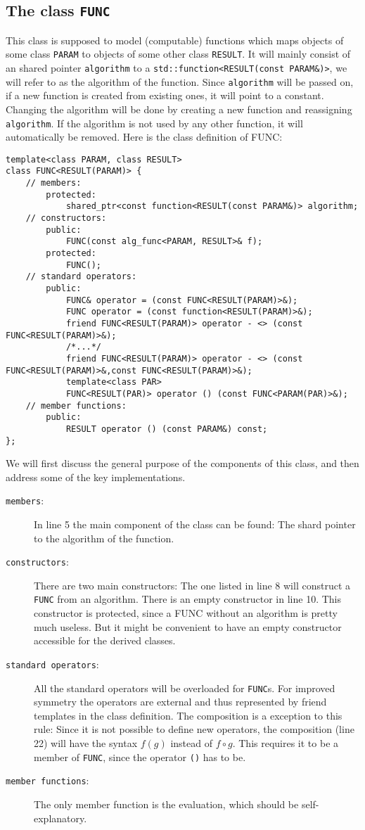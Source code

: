 \documentclass{article}
\newcommand{\code}[1]{\texttt{#1}}
\newcommand{\func}[1]{\texttt{#1}}
\begin{document}
\subsection{The class \func{FUNC}}

This class is supposed to model (computable) functions which maps objects of some class \code{PARAM} to objects of some other class \code{RESULT}. It will mainly consist of an shared pointer \code{algorithm} to a \code{std::function<RESULT(const PARAM\&)>}, we will refer to as the algorithm of the function. Since \code{algorithm} will be passed on, if a new function is created from existing ones, it will point to a constant. Changing the algorithm will be done by creating a new function and reassigning \code{algorithm}. If the algorithm is not used by any other function, it will automatically be removed. Here is the class definition of FUNC:
\begin{lstlisting}
template<class PARAM, class RESULT>
class FUNC<RESULT(PARAM)> {
	// members:
		protected:
			shared_ptr<const function<RESULT(const PARAM&)> algorithm;
	// constructors:
		public:
			FUNC(const alg_func<PARAM, RESULT>& f);
		protected:
			FUNC();
	// standard operators:
		public:
			FUNC& operator = (const FUNC<RESULT(PARAM)>&);
			FUNC operator = (const function<RESULT(PARAM)>&);
			friend FUNC<RESULT(PARAM)> operator - <> (const FUNC<RESULT(PARAM)>&);
			/*...*/
			friend FUNC<RESULT(PARAM)> operator - <> (const FUNC<RESULT(PARAM)>&,const FUNC<RESULT(PARAM)>&);
			template<class PAR>
			FUNC<RESULT(PAR)> operator () (const FUNC<PARAM(PAR)>&);
	// member functions:
		public:
			RESULT operator () (const PARAM&) const;
};
\end{lstlisting}
We will first discuss the general purpose of the components of this class, and then address some of the key implementations.
\begin{description}
\item[\code{members}:] In line 5 the main component of the class can be found: The shard pointer to the algorithm of the function.
\item[\code{constructors}:] There are two main constructors: The one listed in line 8 will construct a \func{FUNC} from an algorithm. There is an empty constructor in line 10. This constructor is protected, since a FUNC without an algorithm is pretty much useless. But it might be convenient to have an empty constructor accessible for the derived classes.
\item[\code{standard operators}:] All the standard operators will be overloaded for \func{FUNC}s. For improved symmetry the operators are external and thus represented by friend templates in the class definition. The composition is a exception to this rule: Since it is not possible to define new operators, the composition (line 22) will have the syntax $f(g)$ instead of $f\circ g$. This requires it to be a member of \func{FUNC}, since the operator \code{()} has to be.
\item[\code{member functions}:] The only member function is the evaluation, which should be self-explanatory.
\end{description}
\end{document}
